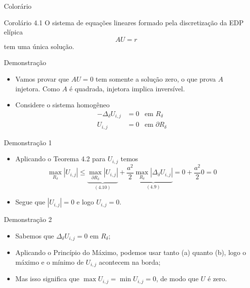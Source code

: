 \documentclass{beamer}
\newcommand{\dR}{\partial R}
\begin{document}
\begin{frame}{Colorário}
\begin{block}{Corolário 4.1}
        O sistema de equações lineares formado pela discretização da EDP elípica
        \[
        AU = r
        \]
        tem uma única solução. 
\end{block}
    
\end{frame}

\begin{frame}{Demonstração}
\begin{itemize}[<+->]
    \item Vamos provar que $AU = 0$ tem somente a solução zero, o que prova $A$ injetora. Como $A$ é quadrada, injetora implica inversível. 
    \item Considere o sistema homogêneo
    \begin{align}
        -\Delta_\delta U_{i,j} &=0 & \text{em } R_\delta \tag{4.9} \\
        U_{i,j} &= 0 & \text{em } \dR_\delta \tag{4.10} 
    \end{align}
\end{itemize}
\end{frame}

\begin{frame}{Demonstração 1}
    \begin{itemize}[<+->]
        \item Aplicando o Teorema 4.2 para $U_{i,j}$ temos
        \[
        \max_{R_\delta} |U_{i,j}| \le \underbrace{\max_{\dR_\delta} |U_{i,j}|}_{(4.10)} + \frac{a^2}{2}\underbrace{\max_{R_\delta} |\Delta_\delta U_{i,j}|}_{(4.9)} = 0 + \frac{a^2}{2}0 = 0
        \]
        \item Segue que $|U_{i,j}| = 0$ e logo $U_{i,j} = 0$.
    \end{itemize}
\end{frame}

\begin{frame}{Demonstração 2}
    \begin{itemize}[<+->]
        \item Sabemos que  $\Delta_\delta U_{i,j} = 0$ em $R_\delta$;
        \item Aplicando o Princípio do Máximo, podemos usar tanto (a) quanto (b), logo o máximo e o mínimo de $U_{i,j}$ acontecem na borda;
        \item Mas isso significa que $\max U_{i,j} = \min U_{i,j} = 0$, de modo que $U$ é zero.
    \end{itemize}
\end{frame}
\end{document}
